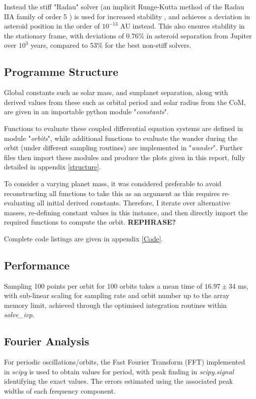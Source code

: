 \documentclass[11pt, a4paper,twocolumn]{article} %
\begin{document}
Instead the stiff "Radau" solver (an implicit Runge-Kutta method of the Radau IIA family of order 5 \cite{Hairer2010}) is used for increased stability \cite{Frank1985}, and achieves a deviation in asteroid position in the order of $ 10^{-13}$ AU instead. This also ensures stability in the stationary frame, with deviations of 0.76\% in asteroid separation from Jupiter over $ 10^{3} $ years, compared to 53\% for the best non-stiff solvers.


\subsection{Programme Structure}
Global constants such as solar mass, and sun\textendash planet separation, along with derived values from these such as orbital period and solar radius from the CoM, are given in an importable python module "\textit{constants}".

Functions to evaluate these coupled differential equation systems are defined in module "\textit{orbits}", while additional functions to evaluate the wander during the orbit (under different sampling routines) are implemented in "\textit{wander}". Further files then import these modules and produce the plots given in this report, fully detailed in appendix \ref{structure}.

To consider a varying planet mass, it was considered preferable to avoid reconstructing all functions to take this as an argument as this requires re-evaluating all initial derived constants. Therefore, I iterate over alternative masses, re-defining constant values in this instance, and then directly import the required functions to compute the orbit. \textbf{REPHRASE?}

Complete code listings are given in appendix \ref{Code}.


\subsection{Performance} \label{Performance}
Sampling 100 points per orbit for 100 orbits takes a mean time of $16.97 \pm 34$ \si{\milli\second}, with sub-linear scaling for sampling rate and orbit number up to the array memory limit, achieved through the optimised integration routines within \textit{solve\_ivp}.

\subsection{Fourier Analysis} \label{Fourier}
For periodic oscillations/orbits, the Fast Fourier Transform (FFT) implemented in \textit{scipy} is used to obtain values for period, with peak finding in \textit{scipy.signal} identifying the exact values. The errors estimated using the associated peak widths of each frequency component.
\end{document}
